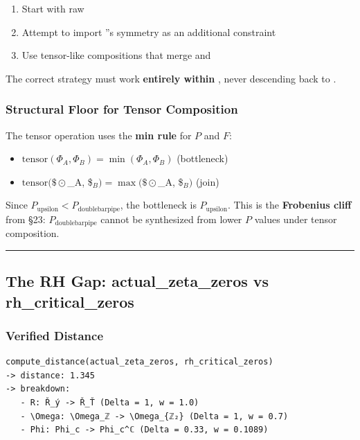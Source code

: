 \documentclass[12pt,a4paper]{article}
\newcommand{\pilcrow}{\S}
\begin{document}
\begin{enumerate}
    \item Start with raw \zeta
    \item Attempt to import \xi''s symmetry as an additional constraint
    \item Use tensor-like compositions that merge \zeta and \xi
\end{enumerate}

The correct strategy must work \textbf{entirely within \xi}, never descending back to \zeta.

\subsubsection{Structural Floor for Tensor Composition}

The tensor operation uses the \textbf{min rule} for $P$ and $F$:

\begin{itemize}
    \item $\text{tensor}(\Phi_A, \Phi_B) = \min(\Phi_A, \Phi_B)$ (bottleneck)
    \item $\text{tensor}(\$\odot$_A, \$\odot$_B) = \max(\$\odot$_A, \$\odot$_B)$ (join)
\end{itemize}

Since $P_{\text{upsilon}} < P_{\text{doublebarpipe}}$, the bottleneck is $P_{\text{upsilon}}$. This is the \textbf{Frobenius cliff} from \pilcrow{}23: $P_{\text{doublebarpipe}}$ cannot be synthesized from lower $P$ values under tensor composition.

\begin{center}
\rule{0.5\textwidth}{0.4pt}
\end{center}

\subsection{The RH Gap: actual\_zeta\_zeros vs rh\_critical\_zeros}

\subsubsection{Verified Distance}

\begin{lstlisting}
compute_distance(actual_zeta_zeros, rh_critical_zeros)
-> distance: 1.345
-> breakdown:
   - R: Ř_ý -> Ř_Ť (Delta = 1, w = 1.0)
   - \Omega: \Omega_ℤ -> \Omega_{ℤ₂} (Delta = 1, w = 0.7)
   - Phi: Phi_c -> Phi_c^ℂ (Delta = 0.33, w = 0.1089)
\end{lstlisting}
\end{document}

